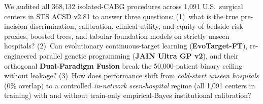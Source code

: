 We audited all 368,132 isolated-CABG procedures across 1,091 U.S.\ surgical centers in STS ACSD v2.81 to answer three questions: (1)~what is the true pre-incision discrimination, calibration, clinical utility, and equity of bedside risk proxies, boosted trees, and tabular foundation models on strictly unseen hospitals? (2)~Can evolutionary continuous-target learning (\textbf{EvoTarget-FT}), re-engineered parallel genetic programming (\textbf{JAIN Ultra GP v2}), and their orthogonal \textbf{Dual-Paradigm Fusion} break the 50,000-patient binary ceiling without leakage? (3)~How does performance shift from \emph{cold-start unseen hospitals} (0\% overlap) to a controlled \emph{in-network seen-hospital} regime (all 1,091 centers in training) with and without train-only empirical-Bayes institutional calibration?
